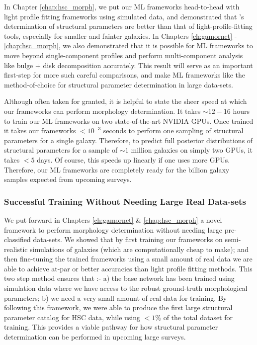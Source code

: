 In Chapter \ref{chap:hsc_morph}, we put our ML frameworks head-to-head with light profile fitting frameworks using simulated data, and demonstrated that \gampen{}'s determination of structural parameters are better than that of light-profile-fitting tools, especially for smaller and fainter galaxies. In Chapters \ref{ch:gamornet} - \ref{chap:hsc_morph}, we also demonstrated that it is possible for ML frameworks to move beyond single-component \sersic{} profiles and perform multi-component analysis like bulge + disk decomposition accurately. This result will serve as an important first-step for more such careful comparisons, and make ML frameworks like \gampen{} the method-of-choice for structural parameter determination in large data-sets.

 
Although often taken for granted, it is helpful to state the sheer speed at which our frameworks can perform morphology determination. It takes $\sim12-16$ hours to train our ML frameworks on two state-of-the-art NVIDIA GPUs. Once trained it takes our frameworks $<10^{-3}$ seconds to perform one sampling of structural parameters for a single galaxy. Therefore, to predict full posterior distributions of structural parameters for a sample of $\sim1$ million galaxies on simply two GPUs, it takes $<5$ days. Of course, this speeds up linearly if one uses more GPUs. Therefore, our ML frameworks are completely ready for the billion galaxy samples expected from upcoming surveys.


\subsubsection{Successful Training Without Needing Large Real Data-sets}
We put forward in Chapters \ref{ch:gamornet} \& \ref{chap:hsc_morph} a novel framework to perform morphology determination without needing large pre-classified data-sets. We showed that by first training our frameworks on semi-realistic simulations of galaxies (which are computationally cheap to make); and then fine-tuning the trained frameworks using a small amount of real data we are able to achieve at-par or better accuracies than light profile fitting methods. This two step method ensures that :- a) the base network has been trained using simulation data where we have access to the robust ground-truth morphological parameters; b) we need a very small amount of real data for training. By following this framework, we were able to produce the first large structural parameter catalog for HSC data, while using $<1\%$ of the total dataset for training. This provides a viable pathway for how structural parameter determination can be performed in upcoming large surveys.  

